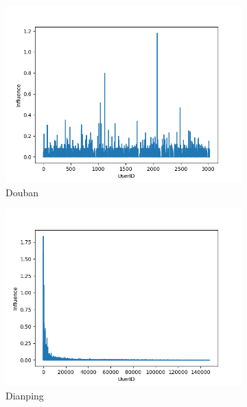 \documentclass{article}
\begin{document}
\begin{figure}[h]    
    \centering
    \begin{subfigure}{0.33\textwidth}
      \centering
        \includegraphics[width=1\linewidth]{pic/figure4_1.png}
      \caption{Douban}
    \end{subfigure}%
    \begin{subfigure}{0.33\textwidth}
    \centering
        \includegraphics[width=1\linewidth]{pic/figure4_2.png}
      \caption{Dianping}
    \end{subfigure}%
    \begin{subfigure}{0.33\textwidth}
      \centering

\end{subfigure}
\end{figure}
\end{document}
